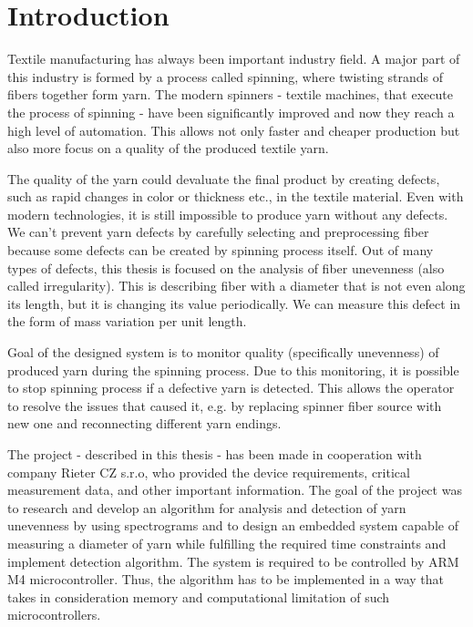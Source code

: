 \documentclass[twoside]{ctuthesis}
\theoremstyle{plain}
\theoremstyle{definition}
\theoremstyle{note}
\begin{document}
	
\maketitle

\chapter{Introduction}
Textile manufacturing has always been important industry field. A major part of this industry is formed by a process called spinning, where twisting strands of fibers together form yarn. The modern spinners - textile machines, that execute the process of spinning - have been significantly improved and now they reach a high level of automation. This allows not only faster and cheaper production but also more focus on a quality of the produced textile yarn. 

The quality of the yarn could devaluate the final product by creating defects, such as rapid changes in color or thickness etc., in the textile material. Even with modern technologies, it is still impossible to produce yarn without any defects. We can't prevent yarn defects by carefully selecting and preprocessing fiber because some defects can be created by spinning process itself. Out of many types of defects, this thesis is focused on the analysis of fiber unevenness (also called irregularity). This is describing fiber with a diameter that is not even along its length, but it is changing its value periodically. We can measure this defect in the form of mass variation per unit length.

Goal of the designed system is to monitor quality (specifically unevenness) of produced yarn during the spinning process. Due to this monitoring, it is possible to stop spinning process if a defective yarn is detected. This allows the operator to resolve the issues that caused it, e.g. by replacing spinner fiber source with new one and reconnecting different yarn endings.

The project - described in this thesis - has been made in cooperation with company Rieter CZ s.r.o, who provided the device requirements, critical measurement data, and other important information. The goal of the project was to research and develop an algorithm for analysis and detection of yarn unevenness by using spectrograms and to design an embedded system capable of measuring a diameter of yarn while fulfilling the required time constraints and implement detection algorithm. The system is required to be controlled by ARM M4 microcontroller. Thus, the algorithm has to be implemented in a way that takes in consideration memory and computational limitation of such microcontrollers.
\end{document}
